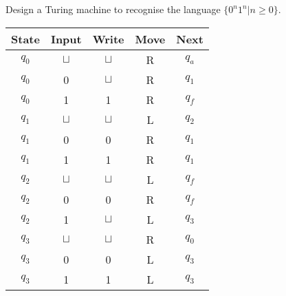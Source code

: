 \documentclass[addpoints,12pt]{exam}
\begin{document}
\begin{questions}
\question
  Design a Turing machine to recognise the language $\{ 0^n 1^n | n \geq 0 \}$.
  \begin{solution}
    \begin{table}[H]
      \centering
      \begin{tabular}{ccccc}
        \toprule
            State & Input & Write & Move & Next \\
        \midrule
            $q_0$ & $\sqcup$ & $\sqcup$ & R & $q_a$ \\
            $q_0$ & 0        & $\sqcup$ & R & $q_1$ \\
            $q_0$ & 1        & 1        & R & $q_f$ \\
        \midrule
            $q_1$ & $\sqcup$ & $\sqcup$ & L & $q_2$ \\
            $q_1$ & 0        & 0        & R & $q_1$ \\
            $q_1$ & 1        & 1        & R & $q_1$ \\
        \midrule
            $q_2$ & $\sqcup$ & $\sqcup$ & L & $q_f$ \\
            $q_2$ & 0        & 0        & R & $q_f$ \\
            $q_2$ & 1        & $\sqcup$ & L & $q_3$ \\
        \midrule
            $q_3$ & $\sqcup$ & $\sqcup$ & R & $q_0$ \\
            $q_3$ & 0        & 0        & L & $q_3$ \\
            $q_3$ & 1        & 1        & L & $q_3$ \\
        \bottomrule
        \hline
      \end{tabular}
    \end{table}
  \end{solution}



\end{questions}
\end{document}
